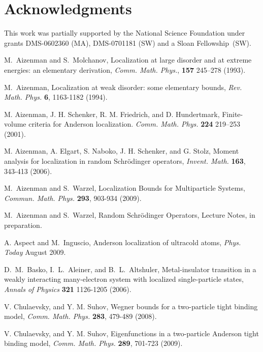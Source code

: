 \documentclass[reqno,keywordsasfootnote]{article}
\numberwithin{equation}{section}
\theoremstyle{definition}
\begin{document}
 
\section*{Acknowledgments}
This work was partially supported by the National Science Foundation under grants DMS-0602360 (MA), DMS-0701181 (SW) and a Sloan Fellowship~(SW).  




\begin{thebibliography}{99}

M.~Aizenman and
S.~Molchanov,
Localization at large disorder and at extreme energies: an elementary derivation,
{\it Comm. Math.
Phys.}, {\bf 157} 245--278 (1993). 

M.~Aizenman, 
Localization at weak disorder: some elementary bounds,
{\em Rev. Math. Phys.} {\bf 6}, 1163-1182 (1994).

  M. Aizenman, J. H. Schenker,  
  R. M. Friedrich, and D. Hundertmark,
Finite-volume criteria for Anderson localization.
{\it Comm. Math. Phys.} {\bf 224} 219--253 (2001).

  M. Aizenman, A. Elgart, S. Naboko, J. H. Schenker, and G. Stolz,
Moment analysis for localization in random Schr\"odinger operators, 
{\it Invent. Math.} {\bf 163}, 343-413 (2006).

 M.~Aizenman and S.~Warzel, Localization Bounds for Multiparticle Systems, 
		{\em Commun. Math. Phys.} {\bf 293}, 903-934 (2009).

 M.~Aizenman and S.~Warzel,   Random Schr\"odinger Operators, Lecture Notes,  
		in preparation.
		
		

A. Aspect and M.~Inguscio, 
Anderson localization of ultracold atoms, 
{\em Phys. Today} August 2009.  

D.~M.~Basko, I.~L.~Aleiner, and B.~L.~Altshuler, 
Metal-insulator transition in a weakly interacting many-electron system with localized single-particle states, 
{\em Annals of Physics} {\bf 321} 1126-1205 (2006).

  V. Chulaevsky, and Y. M. Suhov,
Wegner bounds for a two-particle tight binding model,
{\it Comm. Math. Phys.} {\bf 283}, 479-489 (2008).

  V. Chulaevsky, and Y. M. Suhov,
Eigenfunctions in a two-particle Anderson tight binding model, 
{\it Comm. Math. Phys.} {\bf 289}, 701-723 (2009).


\end{thebibliography}
\end{document}
